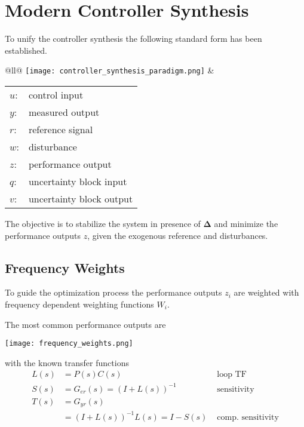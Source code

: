 \section{Modern Controller Synthesis}
To unify the controller synthesis the following standard form has been established.


\setlength{\oldtabcolsep}{\tabcolsep}\setlength\tabcolsep{2pt}

\begin{tabularx}{\linewidth}{@{}ll@{}}
    \texttt{[image: controller\_synthesis\_paradigm.png]}
     &
    {\begin{tabularx}{\linewidth}{@{}ll@{}}
                 $u$: & control input            \\
                 $y$: & measured output          \\
                 $r$: & reference signal         \\
                 $w$: & disturbance              \\
                 $z$: & performance output       \\
                 $q$: & uncertainty block input  \\
                 $v$: & uncertainty block output
             \end{tabularx}
        }
\end{tabularx}

\setlength{\tabcolsep}{\oldtabcolsep}


\newpar{}
The objective is to stabilize the system in presence of $\boldsymbol{\Delta}$ and minimize the performance outputs $z$, given the exogenous reference and disturbances.

\subsection{Frequency Weights}

To guide the optimization process the performance outputs $z_i$ are weighted with frequency dependent weighting functions $W_i$.

The most common performance outputs are
\begin{center}
    \texttt{[image: frequency\_weights.png]}
\end{center}
with the known transfer functions
\begin{align*}
    L(s) & =P(s)C(s)                     & \text{ loop TF}            \\
    S(s) & =G_{er}(s) = {(I+L(s))}^{-1}  & \text{ sensitivity}        \\
    T(s) & = G_{yr}(s)                   &                            \\
         & ={(I+L(s))}^{-1}L(s) = I-S(s) & \text{ comp.\ sensitivity}
\end{align*}

